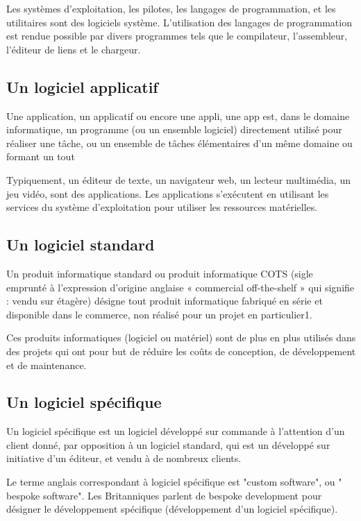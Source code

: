 Les systèmes d'exploitation, les pilotes, les langages de programmation, et les utilitaires sont
des logiciels système. L'utilisation des langages de programmation est rendue possible par divers
programmes tels que le compilateur, l'assembleur, l'éditeur de liens et le chargeur.

\subsection{Un logiciel applicatif}\label{subsec:logiciel-applicatif}
Une application, un applicatif ou encore une appli, une app est, dans le domaine informatique,
un programme (ou un ensemble logiciel) directement utilisé pour réaliser une tâche, ou un ensemble de
tâches élémentaires d'un même domaine ou formant un tout

Typiquement, un éditeur de texte, un navigateur web, un lecteur multimédia, un jeu vidéo, sont des
applications. Les applications s'exécutent en utilisant les services du système d'exploitation
pour utiliser les ressources matérielles.

\subsection{Un logiciel standard}\label{subsec:logiciel-standard}
Un produit informatique standard ou produit informatique COTS (sigle emprunté à l'expression
d'origine anglaise « commercial off-the-shelf » qui signifie : vendu sur étagère)
désigne tout produit informatique fabriqué en série et disponible dans le commerce,
non réalisé pour un projet en particulier1.

Ces produits informatiques (logiciel ou matériel) sont de plus en plus utilisés dans des
projets qui ont pour but de réduire les coûts de conception, de développement et de maintenance.

\subsection{Un logiciel spécifique}\label{subsec:logiciel-specifique}
Un logiciel spécifique est un logiciel développé sur commande à l'attention
d'un client donné, par opposition à un logiciel standard, qui est un développé sur initiative
d'un éditeur, et vendu à de nombreux clients.

Le terme anglais correspondant à logiciel spécifique est "custom software", ou "
bespoke software". Les Britanniques parlent de bespoke development pour désigner le
développement spécifique (développement d'un logiciel spécifique).

